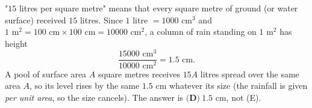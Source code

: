 "$15$ litres per square metre" means that every square metre of ground (or water surface) received $15$ litres. Since $1$ litre $=1000\text{ cm}^3$ and $1\text{ m}^2=100\text{ cm}\times100\text{ cm}=10000\text{ cm}^2$, a column of rain standing on $1\text{ m}^2$ has height
\[
\dfrac{15000\text{ cm}^3}{10000\text{ cm}^2}=1.5\text{ cm}.
\]
A pool of surface area $A$ square metres receives $15A$ litres spread over the same area $A$, so its level rises by the same $1.5$ cm whatever its size (the rainfall is given \emph{per unit area}, so the size cancels). The answer is $\boxed{\textbf{(D)}\ 1.5\text{ cm}}$, not (E).
